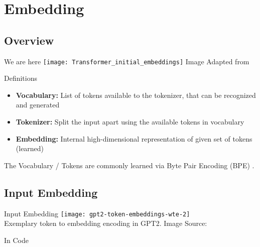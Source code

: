 \section{Embedding}
\subsection{Overview}
\begin{frame}[c]{We are here}
    \texttt{[image: Transformer\_initial\_embeddings]}
    Image Adapted from \cite{vaswani_attention_2017}
\end{frame}

\begin{frame}[c]{Definitions}
    \large
    \begin{itemize}[<+(1)->]
        \item    \textbf{Vocabulary:} List of tokens available to the tokenizer, that can be recognized and generated \\
        \item    \textbf{Tokenizer:} Split the input apart using the available tokens in vocabulary \\
        \item    \textbf{Embedding:} Internal high-dimensional representation of given set of tokens (learned) \\
    \end{itemize}
    \pause
    The Vocabulary / Tokens are commonly learned via Byte Pair
    Encoding (BPE) \cite{shibata_byte_1999}. \\
\end{frame}

\subsection{Input Embedding}
\begin{frame}[c]{Input Embedding}
    \texttt{[image: gpt2-token-embeddings-wte-2]} \\
    \large
    Exemplary token to embedding encoding in GPT2.
    \normalsize
    \textcolor[gray]{0.6}{
    Image Source: \cite{alammar_illustrated_2019}
}
\end{frame}

\begin{frame}[c]{In Code}
    \inputminted{python}{code/embedding.py}
\end{frame}

